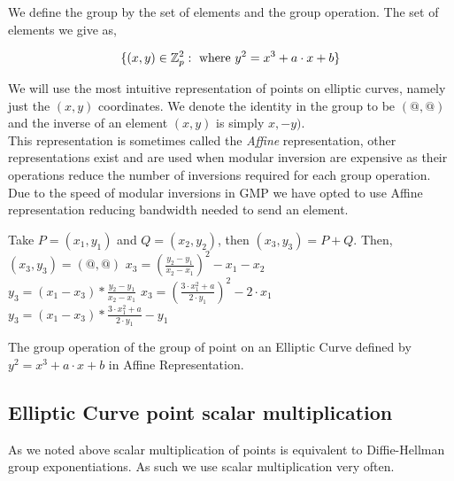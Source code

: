 \documentclass[ %
                    author={Nicholas Tutte},
                supervisor={Prof. Nigel Smart},
                    degree={MEng},
                     title={Secure Two Party Computation},
                  subtitle={A practical comparison of recent protocols},
                      type={Research - GG1K},
                      year={2015} ]{dissertation}
\begin{document}
\begin{appendices}
				We define the group by the set of elements and the group operation. The set of elements we give as,

				$$\{(x, y) \in \mathbb{Z}_p^2 : \textnormal{ where } y^2 = x^3 + a\cdot x + b\} $$

				We will use the most intuitive representation of points on elliptic curves, namely just the $(x, y)$ coordinates. We denote the identity in the group to be $(@, @)$ and the inverse of an element $(x, y)$ is simply $x, -y)$.\\

				This representation is sometimes called the \emph{Affine} representation, other representations exist and are used  when modular inversion are expensive as their operations reduce the number of inversions required for each group operation. Due to the speed of modular inversions in GMP we have opted to use Affine representation reducing bandwidth needed to send an element.\\


				\begin{mdframed}
					\begin{algorithm}[H]
						Take $P = (x_1, y_1)$ and $Q = (x_2, y_2)$, then $(x_3, y_3) = P + Q$. Then,\\[0.15cm]
						{
							$(x_3, y_3) = (@, @)$
						}
						{
							{
								$x_3 = (\frac{y_2 - y_1}{x_2 - x_1})^2 - x_1 - x_2$\\
								$y_3 = (x_1 - x_3) * \frac{y_2 - y_1}{x_2 - x_1}$
							}
							{
								$x_3 = (\frac{3\cdot x_1^2 + a}{2 \cdot y_1}) ^ 2 - 2\cdot x_1$\\
								$y_3 = (x_1 - x_3) * \frac{3 \cdot x_1^2 + a}{2 \cdot y_1} - y_1$
							}
						}

						\caption{The group operation of the group of point on an Elliptic Curve defined by $y^2 = x^3 + a \cdot x + b$ in Affine Representation. \label{Algo:ECC_GroupOp}}
					\end{algorithm}
				\end{mdframed}

				\subsection{Elliptic Curve point scalar multiplication}
					As we noted above scalar multiplication of points is equivalent to Diffie-Hellman group exponentiations. As such we use scalar multiplication very often.\\


\end{appendices}
\end{document}
